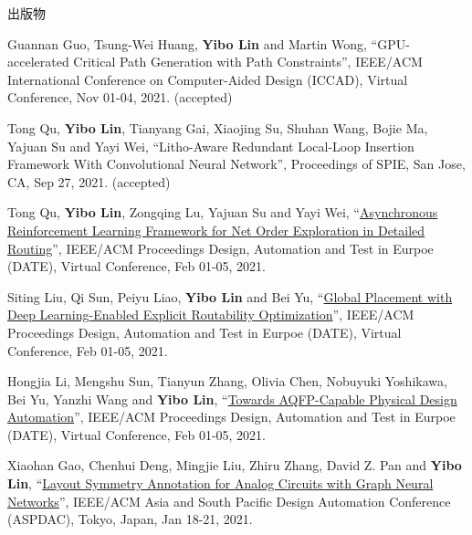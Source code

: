 \begin{rSection}{出版物}
\begin{description}[font=\normalfont]
\item[{[C49]}]{
        Guannan Guo, Tsung-Wei Huang, \textbf{Yibo Lin} and Martin Wong, 
    ``GPU-accelerated Critical Path Generation with Path Constraints'', 
    IEEE/ACM International Conference on Computer-Aided Design (ICCAD), Virtual Conference, Nov 01-04, 2021.
    (accepted)
}
            

\item[{[C48]}]{
        Tong Qu, \textbf{Yibo Lin}, Tianyang Gai, Xiaojing Su, Shuhan Wang, Bojie Ma, Yajuan Su and Yayi Wei, 
    ``Litho-Aware Redundant Local-Loop Insertion Framework With Convolutional Neural Network'', 
    Proceedings of SPIE, San Jose, CA, Sep 27, 2021.
    (accepted)
}
            

\item[{[C47]}]{
        Tong Qu, \textbf{Yibo Lin}, Zongqing Lu, Yajuan Su and Yayi Wei, 
    ``\href{https://doi.org/10.23919/DATE51398.2021.9474007}{Asynchronous Reinforcement Learning Framework for Net Order Exploration in Detailed Routing}'', 
    IEEE/ACM Proceedings Design, Automation and Test in Eurpoe (DATE), Virtual Conference, Feb 01-05, 2021.
    
}
            

\item[{[C46]}]{
        Siting Liu, Qi Sun, Peiyu Liao, \textbf{Yibo Lin} and Bei Yu, 
    ``\href{https://doi.org/10.23919/DATE51398.2021.9473959}{Global Placement with Deep Learning-Enabled Explicit Routability Optimization}'', 
    IEEE/ACM Proceedings Design, Automation and Test in Eurpoe (DATE), Virtual Conference, Feb 01-05, 2021.
    
}
            

\item[{[C45]}]{
        Hongjia Li, Mengshu Sun, Tianyun Zhang, Olivia Chen, Nobuyuki Yoshikawa, Bei Yu, Yanzhi Wang and \textbf{Yibo Lin}, 
    ``\href{https://doi.org/10.23919/DATE51398.2021.9474259}{Towards AQFP-Capable Physical Design Automation}'', 
    IEEE/ACM Proceedings Design, Automation and Test in Eurpoe (DATE), Virtual Conference, Feb 01-05, 2021.
    
}
            

\item[{[C44]}]{
        Xiaohan Gao, Chenhui Deng, Mingjie Liu, Zhiru Zhang, David Z. Pan and \textbf{Yibo Lin}, 
    ``\href{https://doi.org/10.1145/3394885.3431545}{Layout Symmetry Annotation for Analog Circuits with Graph Neural Networks}'', 
    IEEE/ACM Asia and South Pacific Design Automation Conference (ASPDAC), Tokyo, Japan, Jan 18-21, 2021.
    
}
\end{description}
\end{rSection}
